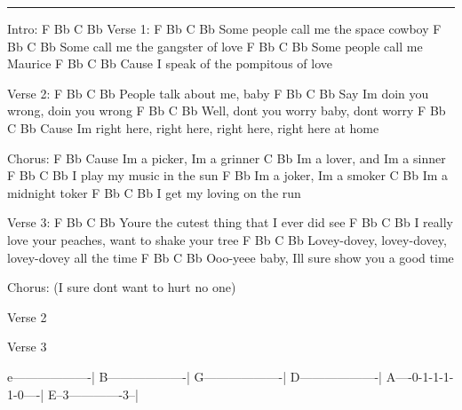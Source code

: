 \noindent\rule{\columnwidth}{1pt}

\begin{lstsong}
Intro: F Bb C Bb 
Verse 1:
F       Bb                 C            Bb
   Some people call me the space cowboy
F       Bb                 C          Bb
   Some call me the gangster of love
F       Bb                  C     Bb
   Some people call me Maurice
F        Bb                 C             Bb
   Cause I speak of the pompitous of love

Verse 2:
F        Bb                 C       Bb
         People talk about me, baby
F         Bb              C              Bb
   Say Im doin you wrong, doin you wrong
F      Bb                   C                 Bb
         Well, dont you worry baby, dont worry
F        Bb                      C                             Bb           
Cause Im right here, right here, right here, right here at home

Chorus:
            F           Bb
Cause Im a picker, Im a grinner
     C               Bb
Im a lover, and Im a sinner
F         Bb           C   Bb
I play my music in the sun
     F           Bb
Im a joker, Im a smoker
     C             Bb
Im a midnight toker
F        Bb            C    Bb
I get my loving on the run

Verse 3:
F                Bb           C            Bb
Youre the cutest thing that I ever did see
F                  Bb               C              Bb
I really love your peaches, want to shake your tree
F                  Bb           C                  Bb
Lovey-dovey, lovey-dovey, lovey-dovey all the time
F                  Bb              C         Bb
Ooo-yeee baby, Ill sure show you a good time

Chorus:
(I sure dont want to hurt no one)

Verse 2

Verse 3
\end{lstsong}
\begin{lsttab}
e-------------------|
B-------------------|
G-------------------|
D-------------------|
A----0-1-1-1-1-0----|
E--3-------------3--|
\end{lsttab}
\newpage

